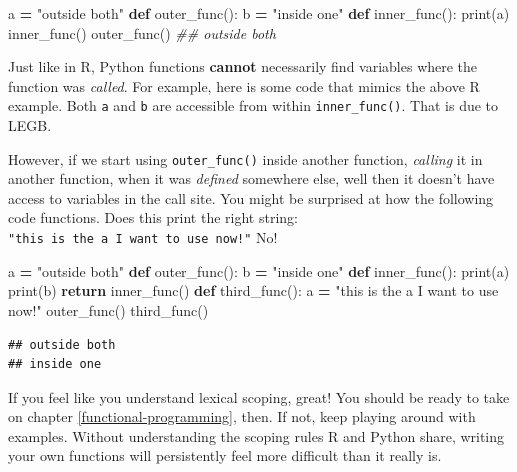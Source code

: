 \documentclass[
  12pt,
  krantz2]{krantz}
\makeatletter
\newenvironment{Shaded}{\begin{snugshade}}{\end{snugshade}}
\newcommand{\BuiltInTok}[1]{#1}
\newcommand{\CommentTok}[1]{\textcolor[rgb]{0.37,0.37,0.37}{\textit{#1}}}
\newcommand{\ControlFlowTok}[1]{\textcolor[rgb]{0.27,0.27,0.27}{\textbf{#1}}}
\newcommand{\KeywordTok}[1]{\textcolor[rgb]{0.27,0.27,0.27}{\textbf{#1}}}
\newcommand{\NormalTok}[1]{#1}
\newcommand{\OperatorTok}[1]{\textcolor[rgb]{0.43,0.43,0.43}{\textbf{#1}}}
\newcommand{\StringTok}[1]{\textcolor[rgb]{0.5,0.5,0.5}{#1}}
\newenvironment{kframe}{%
\medskip{}
\setlength{\fboxsep}{.8em}
 \def\at@end@of@kframe{}%
 \ifinner\ifhmode%
  \def\at@end@of@kframe{\end{minipage}}%
  \begin{minipage}{\columnwidth}%
 \fi\fi%
 \def\FrameCommand##1{\hskip\@totalleftmargin \hskip-\fboxsep
 \colorbox{shadecolor}{##1}\hskip-\fboxsep
     \hskip-\linewidth \hskip-\@totalleftmargin \hskip\columnwidth}%
 \MakeFramed {\advance\hsize-\width
   \@totalleftmargin\z@ \linewidth\hsize
   \@setminipage}}%
 {\par\unskip\endMakeFramed%
 \at@end@of@kframe}
\renewenvironment{Shaded}{\begin{kframe}}{\end{kframe}}
\makeatother
\begin{document}
\begin{Shaded}
\begin{Highlighting}[]
\NormalTok{a }\OperatorTok{=} \StringTok{"outside both"}
\KeywordTok{def}\NormalTok{ outer\_func():}
\NormalTok{  b }\OperatorTok{=} \StringTok{"inside one"}
  \KeywordTok{def}\NormalTok{ inner\_func():}
    \BuiltInTok{print}\NormalTok{(a) }
\NormalTok{  inner\_func()}
\NormalTok{outer\_func()}
\CommentTok{\#\# outside both}
\end{Highlighting}
\end{Shaded}

Just like in R, Python functions \textbf{cannot} necessarily find variables where the function was \emph{called}. For example, here is some code that mimics the above R example. Both \texttt{a} and \texttt{b} are accessible from within \texttt{inner\_func()}. That is due to LEGB.

However, if we start using \texttt{outer\_func()} inside another function, \emph{calling} it in another function, when it was \emph{defined} somewhere else, well then it doesn't have access to variables in the call site. You might be surprised at how the following code functions. Does this print the right string: \texttt{"this\ is\ the\ a\ I\ want\ to\ use\ now!"} No!

\begin{Shaded}
\begin{Highlighting}[]
\NormalTok{a }\OperatorTok{=} \StringTok{"outside both"}
\KeywordTok{def}\NormalTok{ outer\_func():}
\NormalTok{  b }\OperatorTok{=} \StringTok{"inside one"}
  \KeywordTok{def}\NormalTok{ inner\_func():}
    \BuiltInTok{print}\NormalTok{(a) }
    \BuiltInTok{print}\NormalTok{(b)}
  \ControlFlowTok{return}\NormalTok{ inner\_func() }
\KeywordTok{def}\NormalTok{ third\_func():}
\NormalTok{  a }\OperatorTok{=} \StringTok{"this is the a I want to use now!"}
\NormalTok{  outer\_func()}
\NormalTok{third\_func() }
\end{Highlighting}
\end{Shaded}

\begin{verbatim}
## outside both
## inside one
\end{verbatim}

If you feel like you understand lexical scoping, great! You should be ready to take on chapter \ref{functional-programming}, then. If not, keep playing around with examples. Without understanding the scoping rules R and Python share, writing your own functions will persistently feel more difficult than it really is.
\end{document}
